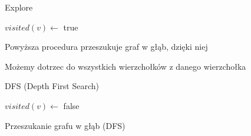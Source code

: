 \documentclass{article}
\begin{document}
\begin{algorithm}[H]
\caption{Explore}
\begin{algorithmic}[1]
    \State $visited(v) \gets$ true
    \State {}
            \State {}
        \EndIf
    \EndFor
    \State {}
\EndProcedure
\end{algorithmic}
\end{algorithm}
\begin{center}
    Powyższa procedura przeszukuje graf w głąb, dzięki niej \par
    Możemy dotrzec do wszystkich wierzchołków z danego wierzchołka \par
\end{center}
\vspace{1\baselineskip}
\begin{algorithm}[H]
\caption{DFS (Depth First Search)}
\begin{algorithmic}[1]
        \State $visited(v) \gets$ false
    \EndFor
            \State {}
        \EndIf
    \EndFor
\EndProcedure
\end{algorithmic}
\end{algorithm}
\begin{center}
    Przeszukanie grafu w głąb (DFS) \par
\end{center}
\end{document}
